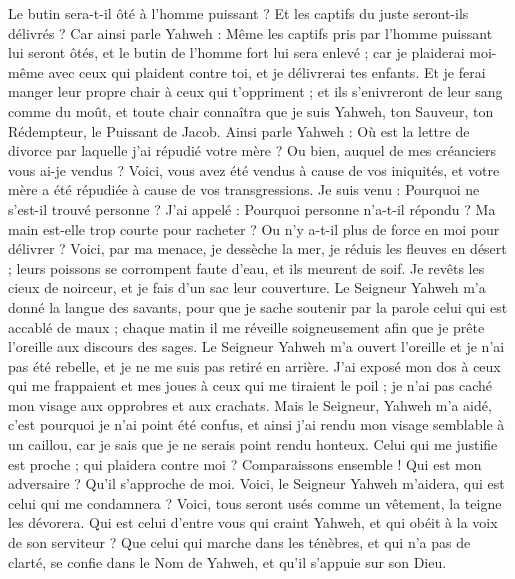 \begin{multicols}{2}
Le butin sera-t-il ôté à l'homme puissant ? Et les captifs du juste seront-ils délivrés ?
Car ainsi parle Yahweh : Même les captifs pris par l'homme puissant lui seront ôtés, et le butin de l'homme fort lui sera enlevé ; car je plaiderai moi-même avec ceux qui plaident contre toi, et je délivrerai tes enfants.
Et je ferai manger leur propre chair à ceux qui t'oppriment ; et ils s'enivreront de leur sang comme du moût, et toute chair connaîtra que je suis Yahweh, ton Sauveur, ton Rédempteur, le Puissant de Jacob.
\VerseOne{}Ainsi parle Yahweh : Où est la lettre de divorce par laquelle j'ai répudié votre mère ? Ou bien, auquel de mes créanciers vous ai-je vendus ? Voici, vous avez été vendus à cause de vos iniquités, et votre mère a été répudiée à cause de vos transgressions.
Je suis venu : Pourquoi ne s'est-il trouvé personne ? J'ai appelé : Pourquoi personne n'a-t-il répondu ? Ma main est-elle trop courte pour racheter ? Ou n'y a-t-il plus de force en moi pour délivrer ? Voici, par ma menace, je dessèche la mer, je réduis les fleuves en désert ; leurs poissons se corrompent faute d'eau, et ils meurent de soif.
Je revêts les cieux de noirceur, et je fais d'un sac leur couverture.
Le Seigneur Yahweh m'a donné la langue des savants, pour que je sache soutenir par la parole celui qui est accablé de maux ; chaque matin il me réveille soigneusement afin que je prête l'oreille aux discours des sages.
Le Seigneur Yahweh m'a ouvert l'oreille et je n'ai pas été rebelle, et je ne me suis pas retiré en arrière.
J'ai exposé mon dos à ceux qui me frappaient et mes joues à ceux qui me tiraient le poil ; je n'ai pas caché mon visage aux opprobres et aux crachats.
Mais le Seigneur, Yahweh m'a aidé, c'est pourquoi je n'ai point été confus, et ainsi j'ai rendu mon visage semblable à un caillou, car je sais que je ne serais point rendu honteux.
Celui qui me justifie est proche ; qui plaidera contre moi ? Comparaissons ensemble ! Qui est mon adversaire ? Qu'il s'approche de moi.
Voici, le Seigneur Yahweh m'aidera, qui est celui qui me condamnera ? Voici, tous seront usés comme un vêtement, la teigne les dévorera.
Qui est celui d'entre vous qui craint Yahweh, et qui obéit à la voix de son serviteur ? Que celui qui marche dans les ténèbres, et qui n'a pas de clarté, se confie dans le Nom de Yahweh, et qu'il s'appuie sur son Dieu.

\end{multicols}
